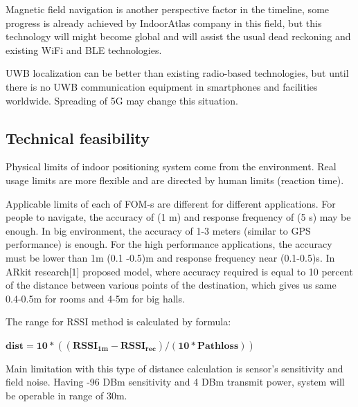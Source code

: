 Magnetic field navigation is another perspective factor in the timeline, some progress is already achieved by IndoorAtlas company in this field, but this technology will might become global and will assist the usual dead reckoning and existing WiFi and BLE technologies.

UWB localization can be better than existing radio-based technologies, but until there is no UWB communication equipment in smartphones and facilities worldwide. Spreading of 5G may change this situation.
%

\subsection{Technical feasibility}

Physical limits of indoor positioning system come from the environment. Real usage limits are more flexible and are directed by human limits (reaction time).

Applicable limits of each of FOM-s are different for different applications. For people to navigate, the accuracy of (1 m) and response frequency of (5 s)  may be enough. In big environment, the accuracy of 1-3 meters (similar to GPS performance) is enough. For the high performance applications, the accuracy must be lower than 1m (0.1 -0.5)m and response frequency near (0.1-0.5)s. In ARkit research[1] proposed model, where accuracy required is equal to 10 percent of the distance between various points of the destination, which gives us same 0.4-0.5m for rooms and 4-5m for big halls.


The range for RSSI method is calculated by formula:

$\mathbf{ dist = 10 * ((RSSI_{1m} - RSSI_{rec})/(10 * Path loss)) }$

Main limitation with this type of distance calculation is sensor's sensitivity and field noise. Having -96 DBm sensitivity and 4 DBm transmit power, system will be operable in range of 30m.

